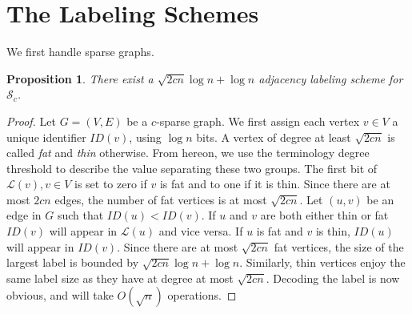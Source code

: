\documentclass{article}
\newtheorem{proposition}{Proposition}
\theoremstyle{remark}
\newcommand{\la}{\ensuremath{ \mathcal{L}}}
\begin{document}
\section{The Labeling Schemes}
We first handle sparse graphs.
\begin{proposition}\label{sparse-label}
There exist a $\sqrt {2cn} \log n+ \log n$ adjacency labeling scheme for $\mathcal{S}_c$.
\end{proposition}
\begin{proof}
Let $G=(V,E)$ be a $c$-sparse graph.
We first assign each vertex $v \in V$ a unique identifier $ID(v)$, using $\log n$ bits.
A vertex of degree at least $\sqrt{2cn}$ is called \emph{fat} and \emph{thin} otherwise.
From hereon, we use the terminology degree threshold to describe the value separating these two groups.
The first bit of $\la(v), v \in V$ is set to  zero if $v$ is fat and to  one if it is thin.
Since there are at most $2cn$ edges, the number of fat vertices  is at most $\sqrt{2cn}$.
Let $(u,v)$ be an edge in $G$ such that $ID(u)<ID(v)$. 
If $u$ and $v$ are both either thin or fat $ID(v)$ will appear in $\la(u)$ and vice versa.
If $u$ is fat and $v$ is thin, $ID(u)$ will appear in $ID(v)$.
Since there are at most $\sqrt{2cn}$ fat vertices, the size of the largest label is bounded by $\sqrt{2cn} \log n +\log n$.
Similarly, thin vertices enjoy the same label size as they have at degree at most $\sqrt{2cn}$.
Decoding the label is now obvious, and will take $O(\sqrt{n})$ operations.
\end{proof}
\end{document}
